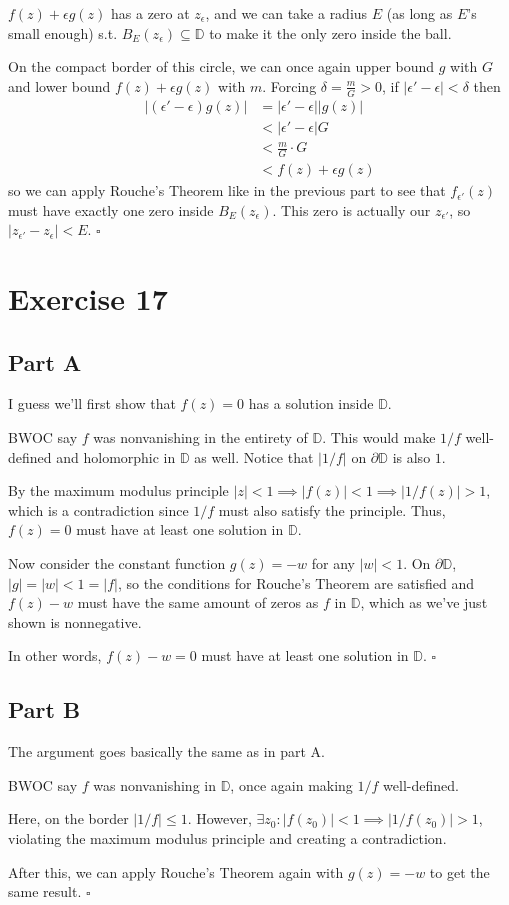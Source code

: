 \documentclass[12pt]{article}
\begin{document}
$f(z)+\epsilon g(z)$ has a zero at $z_\epsilon$, and we can take a radius $E$ (as long as $E$'s small enough)
s.t. $B_E(z_\epsilon) \subseteq \mathbb{D}$ to make it the only zero inside the ball.

On the compact border of this circle, we can once again upper bound $g$ with $G$
and lower bound $f(z)+\epsilon g(z)$ with $m$.
Forcing $\delta=\frac{m}{G}>0$, if $|\epsilon'-\epsilon| < \delta$ then
\begin{align*}
  |(\epsilon' - \epsilon)g(z)|
  &= |\epsilon' - \epsilon| |g(z)| \\
  &< |\epsilon' - \epsilon| G \\
  &< \frac{m}{G} \cdot G \\
  &< f(z)+\epsilon g(z)
\end{align*}
so we can apply Rouche's Theorem like in the previous part to see that
$f_{\epsilon'}(z)$ must have exactly one zero inside $B_E(z_\epsilon)$.
This zero is actually our $z_{\epsilon'}$, so $|z_{\epsilon'} - z_\epsilon| < E$. $\square$

\pagebreak

\section{Exercise 17}

\subsection{Part A}

I guess we'll first show that $f(z)=0$ has a solution inside $\mathbb{D}$.

BWOC say $f$ was nonvanishing in the entirety of $\mathbb{D}$.
This would make $1/f$ well-defined and holomorphic in $\mathbb{D}$ as well.
Notice that $|1/f|$ on $\partial \mathbb{D}$ is also $1$.

By the maximum modulus principle $|z| < 1 \implies |f(z)| < 1 \implies |1/f(z)| > 1$,
which is a contradiction since $1/f$ must also satisfy the principle.
Thus, $f(z)=0$ must have at least one solution in $\mathbb{D}$.

Now consider the constant function $g(z)=-w$ for any $|w| < 1$.
On $\partial \mathbb{D}$, $|g|=|w| < 1 = |f|$, so the conditions for Rouche's Theorem
are satisfied and $f(z)-w$ must have the same amount of zeros as $f$ in $\mathbb{D}$,
which as we've just shown is nonnegative.

In other words, $f(z)-w=0$ must have at least one solution in $\mathbb{D}$. $\square$

\subsection{Part B}

The argument goes basically the same as in part A.

BWOC say $f$ was nonvanishing in $\mathbb{D}$, once again making $1/f$ well-defined.

Here, on the border $|1/f| \le 1$.
However, $\exists z_0: |f(z_0)| < 1 \implies |1/f(z_0)| > 1$, violating
the maximum modulus principle and creating a contradiction.

After this, we can apply Rouche's Theorem again with $g(z)=-w$ to get the same result. $\square$
\end{document}
